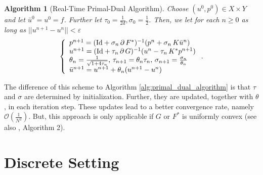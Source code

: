 \documentclass[abstracton]{scrreprt}
\newtheorem{algorithm}[theorem]{Algorithm}
\begin{document}
        \begin{algorithm}[Real-Time Primal-Dual Algorithm]
        \label{alg:realtime_primal_dual_algorithm}
            Choose $(u^{0}, p^{0}) \in X \times Y$ and let $\bar{u}^{0} = u^{0} = f$. Further let $\tau_{0} = \frac{1}{2d}, \sigma_{0} = \frac{1}{2}$. Then, we let for each $n \ge 0$ as long as $||u^{n+1} - u^{n}|| < \varepsilon$
                $$
                    \left\{ 
                        \begin{array}{l l}
                            p^{n+1} = (\textnormal{Id} + \sigma_{n}\,\partial\,F^{\ast})^{-1}(p^{n} + \sigma_{n}\,K\bar{u}^{n}) \\
                            u^{n+1} = (\textnormal{Id} + \tau_{n}\,\partial\,G)^{-1}(u^{n} - \tau_{n}\,K^{\ast}p^{n+1}) \\
                            \theta_{n} = \frac{1}{\sqrt{1 + 4\tau_{n}}}, \, \tau_{n+1} = \theta_{n}\tau_{n}, \, \sigma_{n+1} = \frac{\sigma_{n}}{\theta_{n}} \\
                            \bar{u}^{n+1} = u^{n+1} + \theta_{n} (u^{n+1} - u^{n})
                        \end{array}
                    \right. .
                $$
        \end{algorithm}
        The difference of this scheme to Algorithm \ref{alg:primal_dual_algorithm} is that $\tau$ and $\sigma$ are determined by initialization. Further, they are updated, together with $\theta$, in each iteration step. These updates lead to a better convergence rate, namely $\mathcal{O}\left(\frac{1}{N^{2}}\right)$. But, this approach is only applicable if $G$ or $F^{\ast}$ is uniformly convex (see also \cite{Chambolle10afirst-order}, Algorithm 2).


    \section{Discrete Setting} %
    \label{sec:discrete_setting}
\end{document}
